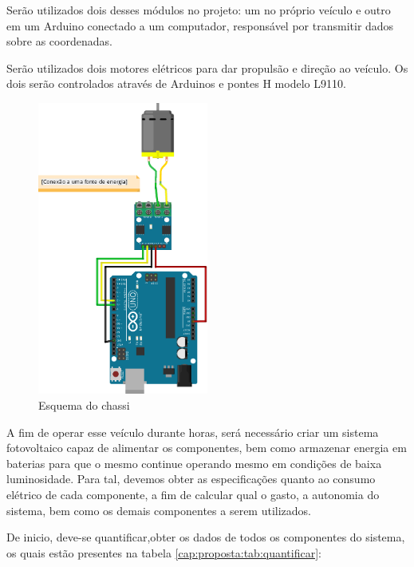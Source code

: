 Serão utilizados dois desses módulos no projeto: um no próprio veículo e outro em um Arduino conectado a um computador, responsável por transmitir dados sobre as coordenadas.

Serão utilizados dois motores elétricos para dar propulsão e direção ao veículo. Os dois serão controlados através de Arduinos e pontes H modelo L9110.

\begin{figure}[H]
    \centering
    \includegraphics[width=0.5\textwidth]{figuras/MOTORBB.png}
    \caption{Esquema do chassi}
    \label{fig:fritz:motor}
\end{figure}

A fim de operar esse veículo durante horas, será necessário criar um sistema fotovoltaico capaz de alimentar os componentes, bem como armazenar energia em baterias para que o mesmo continue operando mesmo em condições de baixa luminosidade. Para tal, devemos obter as especificações quanto ao consumo elétrico de cada componente, a fim de calcular qual o gasto, a autonomia do sistema, bem como os demais componentes a serem utilizados.

De inicio, deve-se quantificar,obter os dados de todos os componentes do sistema, os quais estão presentes na tabela \ref{cap:proposta:tab:quantificar}:


